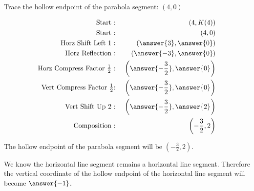 \documentclass{ximera}
\begin{document}
\begin{procedure} 



Trace the hollow endpoint of the parabola segment: $(4, 0)$





\begin{align*}
\text{Start :} & \text{  } & (4, K(4))  \\
\text{Start :} & \text{  } & (4, 0) \\
\text{Horz Shift Left $1$ :} & \text{  } & \left( \answer{3}, \answer{0} \right)   \\
\text{Horz Reflection :} & \text{  } & \left( \answer{-3}, \answer{0} \right)   \\
\text{Horz Compress Factor $\tfrac{1}{2}$ :}  & \text{  } & \left( \answer{-\frac{3}{2}}, \answer{0} \right)   \\
\text{Vert Compress Factor $\tfrac{1}{2}$:} & \text{  } & \left( \answer{-\frac{3}{2}}, \answer{0} \right)   \\
\text{Vert Shift Up $2$ :} & \text{  } & \left( \answer{-\frac{3}{2}}, \answer{2} \right)   \\
\text{Composition :} & \text{  } & \left( -\frac{3}{2}, 2 \right)   
\end{align*}


The hollow endpoint of the parabola segment will be $\left( -\frac{3}{2}, 2 \right)$.

\end{procedure}
















\begin{question} 

We know the horizontal line segment remains a horizontal line segment. Therefore the vertical coordinate of the hollow endpoint of the horizontal line segment will become $\answer{-1}$.

\end{question}




  
\end{document}
